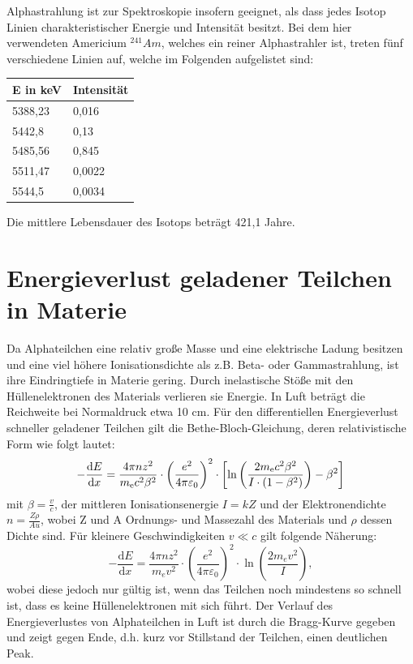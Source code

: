 \documentclass[bigchapter,colorback,accentcolor=tud4b,linedtoc,11pt]{tudreport}
\begin{document}
Alphastrahlung ist zur Spektroskopie insofern geeignet, als dass jedes Isotop Linien charakteristischer Energie und Intensität besitzt. Bei dem hier verwendeten Americium $^{241}Am$, welches ein reiner Alphastrahler ist, treten fünf verschiedene Linien auf, welche im Folgenden aufgelistet sind: 

\begin{center}
  \begin{tabular}{|p{5cm}|p{5cm}|}
    \hline
    E in keV & Intensität \\ \hline
    5388,23 & 0,016   \\ \hline
    5442,8 & 0,13   \\ \hline
    5485,56 & 0,845  \\ \hline
    5511,47 & 0,0022  \\ \hline
    5544,5 & 0,0034  \\ \hline
        \end{tabular}
\end{center}

Die mittlere Lebensdauer des Isotops beträgt 421,1 Jahre.

\section{Energieverlust geladener Teilchen in Materie}

Da Alphateilchen eine relativ große Masse und eine elektrische Ladung besitzen und eine viel höhere Ionisationsdichte als z.B. Beta- oder Gammastrahlung, ist ihre Eindringtiefe in Materie gering. Durch inelastische Stöße mit den Hüllenelektronen des Materials verlieren sie Energie. In Luft beträgt die Reichweite bei Normaldruck etwa 10 cm. Für den differentiellen Energieverlust schneller geladener Teilchen gilt die Bethe-Bloch-Gleichung, deren relativistische Form wie folgt lautet:
$$ - \frac{\mathrm{d}E}{\mathrm{d}x} = \frac{4 \pi nz^2}{m_{\rm e} c^2 \beta^2 } \cdot \left(\frac{e^2}{4\pi\varepsilon_0}\right)^2 \cdot \left[\ln \left(\frac{2m_{\rm e} c^2 \beta^2}{I \cdot (1-\beta^2)}\right) - \beta^2\right]$$
mit $\beta = \frac{v}{c}$, der mittleren Ionisationsenergie $I = kZ$ und der Elektronendichte $n = \frac{Z \rho}{A u}$, wobei Z und A Ordnungs- und Massezahl des Materials und $\rho$ dessen Dichte sind.
Für kleinere Geschwindigkeiten $v \ll c$ gilt folgende Näherung: 
$$- \frac{\mathrm{d}E}{\mathrm{d}x} = \frac{4 \pi nz^2}{m_e v^2}
\cdot \left(\frac{e^2}{4\pi\varepsilon_0}\right)^2
\cdot \ln \left(\frac{2m_e v^2 }{I}\right),$$
wobei diese jedoch nur gültig ist, wenn das Teilchen noch mindestens so schnell ist, dass es keine Hüllenelektronen mit sich führt.
Der Verlauf des Energieverlustes von Alphateilchen in Luft ist durch die Bragg-Kurve gegeben und zeigt gegen Ende, d.h. kurz vor Stillstand der Teilchen, einen deutlichen Peak.
\end{document}

